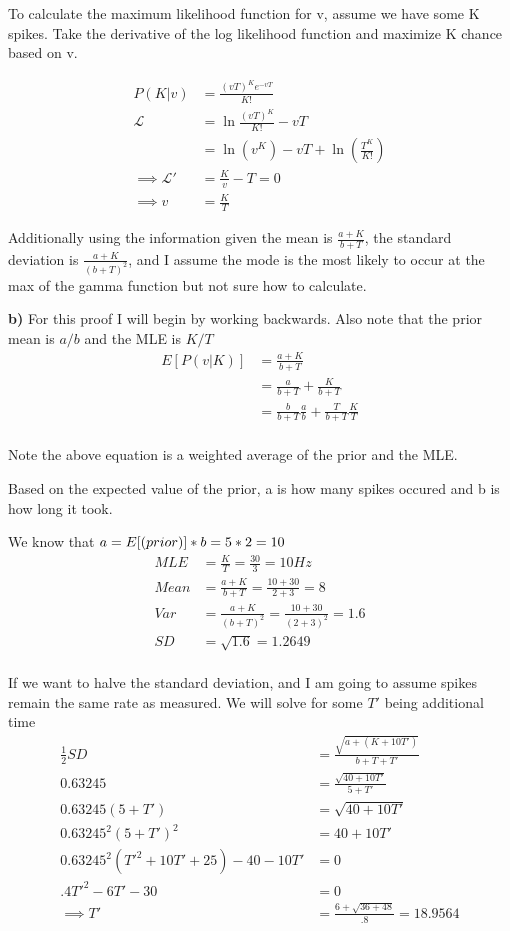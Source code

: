 \documentclass{article}
\begin{document}
To calculate the maximum likelihood function for v, assume we have some K spikes. Take the
derivative of the log likelihood function and maximize K chance based on v.

\begin{align}
    P(K|v) &= \frac{(vT)^Ke^{-vT}}{K!}\\
    \mathcal{L} &= \ln{\frac{(vT)^K}{K!}}-vT\\
    &= \ln(v^K) - vT + \ln\left(\frac{T^K}{K!}\right)\\
    \implies \mathcal{L}' &= \frac{K}{v} - T = 0\\
    \implies v &= \frac{K}{T}
\end{align}

Additionally using the information given the mean is $\frac{a+K}{b+T}$, the standard deviation is
$\frac{a+K}{(b+T)^2}$, and I assume the mode is the most likely to occur at the max of the gamma function but not sure how to calculate.

\textbf{b)} For this proof I will begin by working backwards. Also note that the prior mean is 
$a/b$ and the MLE is $K/T$
\begin{align}
    E[P(v|K)] &= \frac{a+K}{b+T}\\
    &= \frac{a}{b+T} + \frac{K}{b+T}\\
    &= \frac{b}{b+T} \frac{a}{b} + \frac{T}{b+T} \frac{K}{T}\\
\end{align}

Note the above equation is a weighted average of the prior and the MLE.

Based on the expected value of the prior, a is how many spikes occured and b is how long it took.

We know that $a = E[\text(prior)] * b= 5 *2 = 10$
\begin{align}
    MLE &= \frac{K}{T} = \frac{30}{3} = 10Hz\\
    Mean &= \frac{a+K}{b+T} = \frac{10 + 30}{2+3} = 8\\
    Var & = \frac{a+K}{(b+T)^2} = \frac{10 + 30}{(2+3)^2} = 1.6\\
    SD & = \sqrt{1.6} = 1.2649\\
\end{align}

If we want to halve the standard deviation, and I am going to assume spikes remain the same rate as measured.
We will solve for some $T'$ being additional time
\begin{align}
    \frac{1}{2}SD &= \frac{\sqrt{a+(K + 10T')}}{b+T+T'}\\
    0.63245 &= \frac{\sqrt{40 + 10T'}}{5+T'}\\
    0.63245(5+T') &= \sqrt{40 + 10T'}\\
    0.63245^2(5+T')^2 &= 40 + 10T'\\
    0.63245^2(T'^2+10T'+25)-40-10T' &= 0\\
    .4T'^2 -6T'-30 &= 0\\
    \implies T' &= \frac{6+ \sqrt{36+48}}{.8} = 18.9564\\
\end{align}
\end{document}
